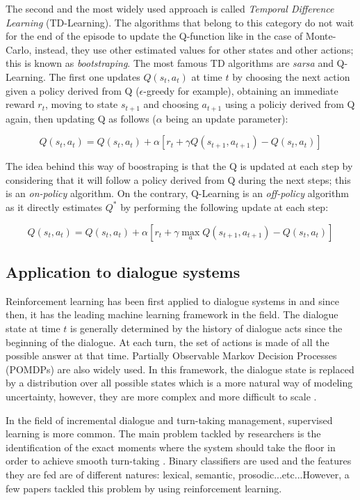         The second and the most widely used approach is called \textit{Temporal Difference Learning} (TD-Learning). The algorithms that belong to this category do not wait for the end of the episode to update the Q-function like in the case of Monte-Carlo, instead, they use other estimated values for other states and other actions; this is known as \textit{bootstraping}. The most famous TD algorithms are \textit{sarsa} and Q-Learning. The first one updates $Q(s_t,a_t)$ at time $t$ by choosing the next action given a policy derived from Q ($\epsilon$-greedy for example), obtaining an immediate reward $r_t$, moving to state $s_{t+1}$ and choosing $a_{t+1}$ using a policiy derived from Q again, then updating Q as follows ($\alpha$ being an update parameter):

            $$ Q(s_t,a_t) = Q(s_t,a_t) + \alpha [r_t + \gamma Q(s_{t+1},a_{t+1}) - Q(s_t,a_t)] $$

        The idea behind this way of boostraping is that the Q is updated at each step by considering that it will follow a policy derived from Q during the next steps; this is an \textit{on-policy} algorithm. On the contrary, Q-Learning \cite{Watkins1989} is an \textit{off-policy} algorithm as it directly estimates $Q^*$ by performing the following update at each step:

            $$ Q(s_t,a_t) = Q(s_t,a_t) + \alpha [r_t + \gamma \max_a Q(s_{t+1},a_{t+1}) - Q(s_t,a_t)] $$


    \subsection{Application to dialogue systems}
    
    	Reinforcement learning has been first applied to dialogue systems in \cite{Levin1997} and since then, it has the leading machine learning framework in the field. The dialogue state at time $t$ is generally determined by the history of dialogue acts since the beginning of the dialogue. At each turn, the set of actions is made of all the possible answer at that time. Partially Observable Markov Decision Processes (POMDPs) are also widely used. In this framework, the dialogue state is replaced by a distribution over all possible states which is a more natural way of modeling uncertainty, however, they are more complex and more difficult to scale \cite{Lemon2007}.
        
        In the field of incremental dialogue and turn-taking management, supervised learning is more common. The main problem tackled by researchers is the identification of the exact moments where the system should take the floor in order to achieve smooth turn-taking \cite{Raux2008,Meena2013}. Binary classifiers are used and the features they are fed are of different natures: lexical, semantic, prosodic...etc...However, a few papers tackled this problem by using reinforcement learning.
        
